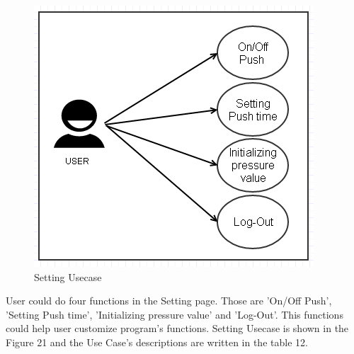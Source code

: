 \documentclass[conference]{IEEEtran}
\begin{document}
\begin{figure}[H]
\begin{center}
    \includegraphics[scale=0.8]{img_22.png}
    \caption{Setting Usecase} 
\end{center}
\end{figure}
  	        	  

 User could do four functions in the Setting page. Those are 'On/Off Push', 'Setting Push time', 'Initializing pressure value' and 'Log-Out'. This functions could help user customize program's functions. Setting Usecase is shown in the Figure 21 and the Use Case's descriptions are written in the table 12.
\end{document}
